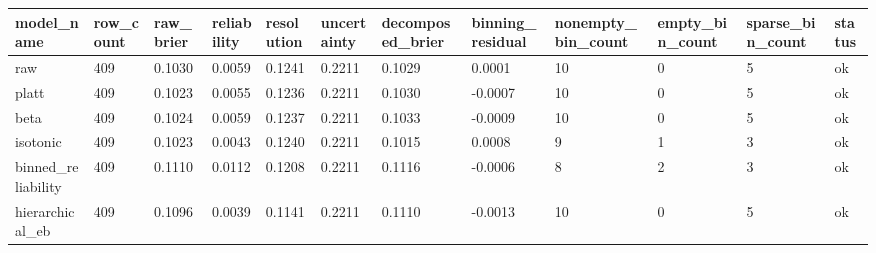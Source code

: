 \begin{tabular}{llllllllllll}
\toprule
model\_name & row\_count & raw\_brier & reliability & resolution & uncertainty & decomposed\_brier & binning\_residual & nonempty\_bin\_count & empty\_bin\_count & sparse\_bin\_count & status \\
\midrule
raw & 409 & 0.1030 & 0.0059 & 0.1241 & 0.2211 & 0.1029 & 0.0001 & 10 & 0 & 5 & ok \\
platt & 409 & 0.1023 & 0.0055 & 0.1236 & 0.2211 & 0.1030 & -0.0007 & 10 & 0 & 5 & ok \\
beta & 409 & 0.1024 & 0.0059 & 0.1237 & 0.2211 & 0.1033 & -0.0009 & 10 & 0 & 5 & ok \\
isotonic & 409 & 0.1023 & 0.0043 & 0.1240 & 0.2211 & 0.1015 & 0.0008 & 9 & 1 & 3 & ok \\
binned\_reliability & 409 & 0.1110 & 0.0112 & 0.1208 & 0.2211 & 0.1116 & -0.0006 & 8 & 2 & 3 & ok \\
hierarchical\_eb & 409 & 0.1096 & 0.0039 & 0.1141 & 0.2211 & 0.1110 & -0.0013 & 10 & 0 & 5 & ok \\
\bottomrule
\end{tabular}
